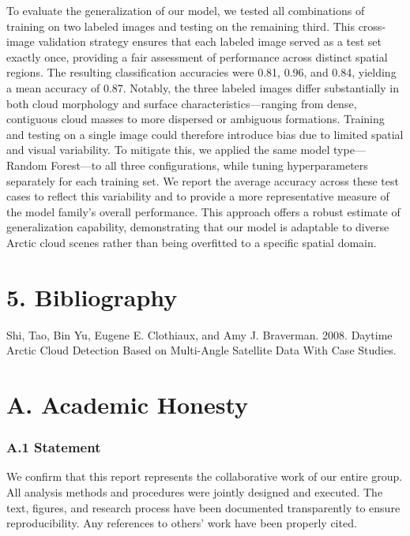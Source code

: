 \documentclass[11pt]{article}
\begin{document}
To evaluate the generalization of our model, we tested all combinations of training on two labeled images and testing on the remaining third. This cross-image validation strategy ensures that each labeled image served as a test set exactly once, providing a fair assessment of performance across distinct spatial regions. The resulting classification accuracies were 0.81, 0.96, and 0.84, yielding a mean accuracy of 0.87. Notably, the three labeled images differ substantially in both cloud morphology and surface characteristics—ranging from dense, contiguous cloud masses to more dispersed or ambiguous formations. Training and testing on a single image could therefore introduce bias due to limited spatial and visual variability. To mitigate this, we applied the same model type—Random Forest—to all three configurations, while tuning hyperparameters separately for each training set. We report the average accuracy across these test cases to reflect this variability and to provide a more representative measure of the model family’s overall performance. This approach offers a robust estimate of generalization capability, demonstrating that our model is adaptable to diverse Arctic cloud scenes rather than being overfitted to a specific spatial domain.


\section*{5. Bibliography}\label{bibliography}

Shi, Tao, Bin Yu, Eugene E. Clothiaux, and Amy J. Braverman. 2008.
Daytime Arctic Cloud Detection Based on Multi-Angle Satellite Data With
Case Studies.

\section*{A. Academic Honesty}\label{a.-academic-honesty}

    \subsubsection*{A.1 Statement}\label{a.1-statement}

We confirm that this report represents the collaborative work of our
entire group. All analysis methods and procedures were jointly designed
and executed. The text, figures, and research process have been
documented transparently to ensure reproducibility. Any references to
others' work have been properly cited.
\end{document}

